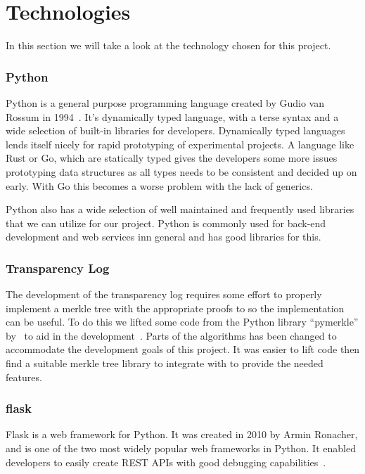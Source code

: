 \documentclass[../Main/thesis.tex]{subfiles}
\begin{document}
\chapter{Technologies}\label{ch:technologies}
In this section we will take a look at the technology chosen for this project.

\subsection*{Python}
Python is a general purpose programming language created by Gudio van Rossum in
1994~\cite{python}. It's dynamically typed language, with a terse syntax and a wide selection
of built-in libraries for developers. Dynamically typed languages lends itself
nicely for rapid prototyping of experimental projects. A language like Rust or
Go, which are statically typed gives the developers some more issues prototyping
data structures as all types needs to be consistent and decided up on early.
With Go this becomes a worse problem with the lack of generics.

Python also has a wide selection of well maintained and frequently used
libraries that we can utilize for our project. Python is commonly used for
back-end development and web services inn general and has good libraries for
this.

\subsection*{Transparency Log}%
\label{sub:transparency_log_library}
The development of the transparency log requires some effort to properly
implement a merkle tree with the appropriate proofs to so the implementation can
be useful. To do this we lifted some code from the Python library ``pymerkle''
by~\citeauthor{pymerkeltools} to aid in the development~\cite{pymerkeltools}.
Parts of the algorithms has been changed to accommodate the development goals of
this project. It was easier to lift code then find a suitable merkle tree
library to integrate with to provide the needed features.

\subsection*{flask}
Flask is a web framework for Python. It was created in 2010 by Armin Ronacher,
and is one of the two most widely popular web frameworks in Python. It enabled
developers to easily create REST APIs with good debugging capabilities~\cite{flask}.
\end{document}
